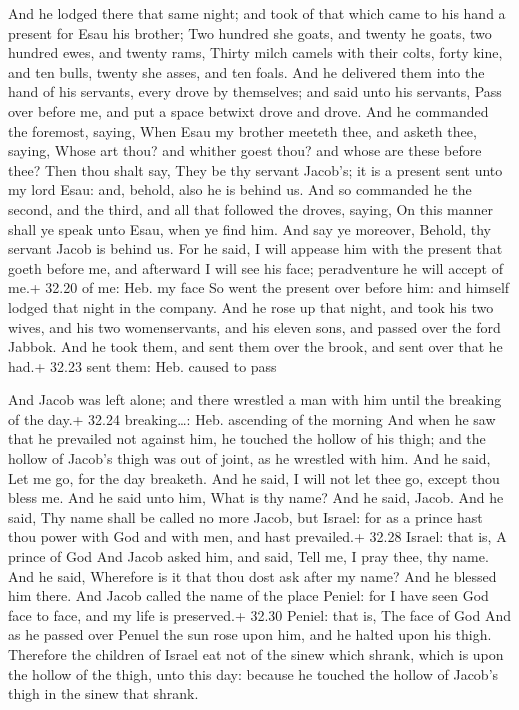  And he lodged there that same night; and took of that
which came to his hand a present for Esau his brother;  Two
hundred she goats, and twenty he goats, two hundred ewes, and twenty
rams,  Thirty milch camels with their colts, forty kine,
and ten bulls, twenty she asses, and ten foals.  And he
delivered them into the hand of his servants, every drove by themselves;
and said unto his servants, Pass over before me, and put a space betwixt
drove and drove.  And he commanded the foremost, saying,
When Esau my brother meeteth thee, and asketh thee, saying, Whose art
thou? and whither goest thou? and whose are these before thee?
 Then thou shalt say, They be thy servant Jacob's; it is a
present sent unto my lord Esau: and, behold, also he is behind us.
 And so commanded he the second, and the third, and all
that followed the droves, saying, On this manner shall ye speak unto
Esau, when ye find him.  And say ye moreover, Behold, thy
servant Jacob is behind us. For he said, I will appease him with the
present that goeth before me, and afterward I will see his face;
peradventure he will accept of me.+ 32.20 of me: Heb. my face
 So went the present over before him: and himself lodged
that night in the company.  And he rose up that night, and
took his two wives, and his two womenservants, and his eleven sons, and
passed over the ford Jabbok.  And he took them, and sent
them over the brook, and sent over that he had.+ 32.23 sent them: Heb.
caused to pass

 And Jacob was left alone; and there wrestled a man with
him until the breaking of the day.+ 32.24 breaking\ldots: Heb. ascending
of the morning  And when he saw that he prevailed not
against him, he touched the hollow of his thigh; and the hollow of
Jacob's thigh was out of joint, as he wrestled with him. 
And he said, Let me go, for the day breaketh. And he said, I will not
let thee go, except thou bless me.  And he said unto him,
What is thy name? And he said, Jacob.  And he said, Thy
name shall be called no more Jacob, but Israel: for as a prince hast
thou power with God and with men, and hast prevailed.+ 32.28 Israel:
that is, A prince of God  And Jacob asked him, and said,
Tell me, I pray thee, thy name. And he said, Wherefore is it that thou
dost ask after my name? And he blessed him there.  And
Jacob called the name of the place Peniel: for I have seen God face to
face, and my life is preserved.+ 32.30 Peniel: that is, The face of God
 And as he passed over Penuel the sun rose upon him, and he
halted upon his thigh.  Therefore the children of Israel
eat not of the sinew which shrank, which is upon the hollow of the
thigh, unto this day: because he touched the hollow of Jacob's thigh in
the sinew that shrank.

